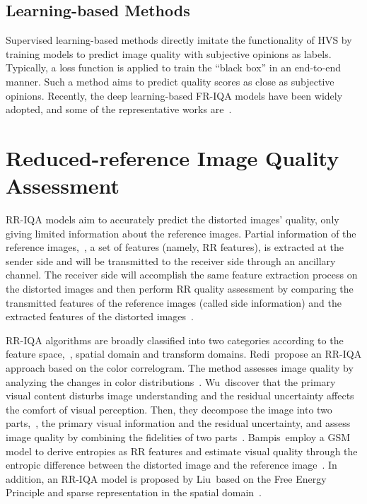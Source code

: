 \subsection{Learning-based Methods}
Supervised learning-based methods directly imitate the functionality of HVS by training models to predict image quality with subjective opinions as labels. Typically, a loss function is applied to train the ``black box'' in an end-to-end manner. Such a method aims to predict quality scores as close as subjective opinions. Recently, the deep learning-based FR-IQA models have been widely adopted, and some of the representative works are~\citep{liang2016image, gao2017deepsim, kim2017deep, bosse2017deep, prashnani2018pieapp, dingIQA}.

\section{Reduced-reference Image Quality Assessment}
RR-IQA models aim to accurately predict the distorted images' quality, only giving limited information about the reference images. Partial information of the reference images,~\eg, a set of features (namely, RR features), is extracted at the sender side and will be transmitted to the receiver side through an ancillary channel. The receiver side will accomplish the same feature extraction process on the distorted images and then perform RR quality assessment by comparing the transmitted features of the reference images (called side information) and the extracted features of the distorted images~\citep{wang2011reduced}. 

RR-IQA algorithms are broadly classified into two categories according to the feature space,~\ie, spatial domain and transform domains. Redi~\etal propose an RR-IQA approach based on the color correlogram. The method assesses image quality by analyzing the changes in color distributions~\citep{redi2010color}. Wu~\etal discover that the primary visual content disturbs image understanding and the residual uncertainty affects the comfort of visual perception. Then, they decompose the image into two parts,~\ie, the primary visual information and the residual uncertainty, and assess image quality by combining the fidelities of two parts~\citep{wu2013reduced}. Bampis~\etal employ a GSM model to derive entropies as RR features and estimate visual quality through the entropic difference between the distorted image and the reference image~\citep{bampis2017speed}. In addition, an RR-IQA model is proposed by Liu~\etal based on the Free Energy Principle and sparse representation in the spatial domain~\citep{liu2017reduced, friston2010free, friston2006free}.


